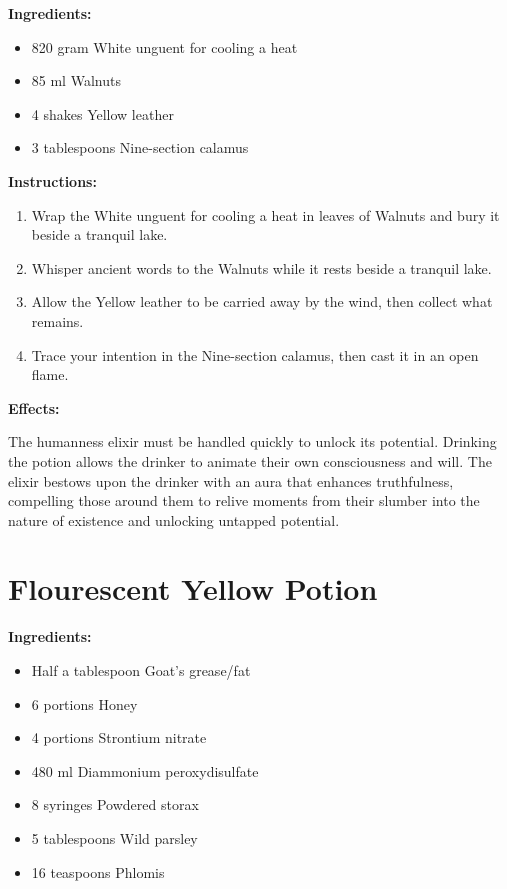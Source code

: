 \documentclass{article}
\begin{document}
\textbf{Ingredients:}

\begin{itemize}
  \item 820 gram White unguent for cooling a heat
  \item 85 ml Walnuts
  \item 4 shakes Yellow leather
  \item 3 tablespoons Nine-section calamus
\end{itemize}

\textbf{Instructions:}

\begin{enumerate}
  \item Wrap the White unguent for cooling a heat in leaves of Walnuts and bury it beside a tranquil lake.
  \item Whisper ancient words to the Walnuts while it rests beside a tranquil lake.
  \item Allow the Yellow leather to be carried away by the wind, then collect what remains.
  \item Trace your intention in the Nine-section calamus, then cast it in an open flame.
\end{enumerate}

\textbf{Effects:}

The humanness elixir must be handled quickly to unlock its potential. Drinking the potion allows the drinker to animate their own consciousness and will. The elixir bestows upon the drinker with an aura that enhances truthfulness, compelling those around them to relive moments from their slumber into the nature of existence and unlocking untapped potential.

\newpage
\section*{Flourescent Yellow Potion}

\textbf{Ingredients:}

\begin{itemize}
  \item Half a tablespoon Goat's grease/fat
  \item 6 portions Honey
  \item 4 portions Strontium nitrate
  \item 480 ml Diammonium peroxydisulfate
  \item 8 syringes Powdered storax
  \item 5 tablespoons Wild parsley
  \item 16 teaspoons Phlomis
\end{itemize}
\end{document}

